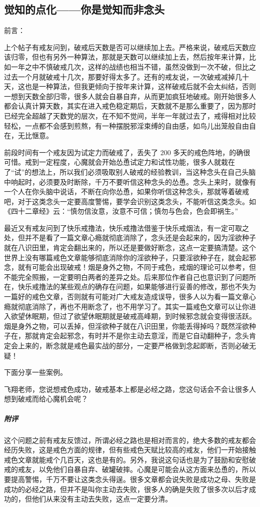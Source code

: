 \subsection{觉知的点化——你是觉知而非念头}

前言：

上个帖子有戒友问到，破戒后天数是否可以继续加上去。严格来说，破戒后天数应该归零，但也有另外一种算法，那就是天数可以继续加上去，然后按年来计算，比如一年之中不慎破戒几次，这样的战绩也相当不错，虽然没做到一次不破，但比之过去一个月就破戒十几次，那要好得太多了。还有的戒友说，一次破戒减掉几十天，这也是一种算法，但我更倾向于按年来计算，这样破戒后就不会太纠结，否则一想到天数全部归零，很多人就会自暴自弃，从而更加疯狂地破戒。刚开始很多人都会认真计算天数，其实在进入戒色稳定期后，天数就不是那么重要了，因为那时已经完全超越了天数党的层次，在不知不觉间，半年一年就过去了，戒得相对比较轻松，一点都不会感到煎熬，有一种摆脱邪淫束缚的自由感，如鸟儿出笼般自由自在，无比惬意。

前段时间有一个戒友因为试定力而破戒了，丢失了 200 多天的戒色阵地，的确很可惜。戒到一定程度，心魔就会开始怂恿试定力和试性功能，很多人就栽在了“试”的想法上，所以我们必须吸取别人破戒的经验教训，当这种念头在自己头脑中响起时，必须要及时断除，千万不要听信这种念头的怂恿。念头上来时，就像有一个人在你头脑中说话，不断在向你怂恿，如果你听信这种念头，那就等着破戒吧，对于这类念头一定要高度警惕，要学会识别这类念头，不能听信这类念头。如《四十二章经》云：“慎勿信汝意，汝意不可信；慎勿与色会，色会即祸生。”

最近又有戒友问到了快乐戒撸法，快乐戒撸法借鉴于快乐戒烟法，有一定可取之处，但并不是看了一篇文章心瘾就彻底消除了，念头还是会起来的，因为淫欲种子就在八识田里，肯定会翻出来的，所以还是要做好断念，这点一定要搞清楚。这个世界上没有哪篇戒色文章能够彻底消除你的淫欲种子，只要淫欲种子在，就会起邪念，就有可能会出现破戒！烟是身外之物，不同于戒色，戒烟的理论可以参考，但不能完全照搬，一定要明白两者的差异之处。后来那位作者自己也意识到了问题所在，快乐戒撸法的某些观点的确存在问题，如果能够进行妥善的修改，那也不失为一篇好的戒色文章，否则就有可能对广大戒友造成误导，很多人以为看一篇文章心瘾就彻底消除了，再也不用断念了，也不用学习了。其实一篇戒色文章可以让你进入欲望休眠期，但过了欲望休眠期就是破戒高峰期，到时候邪念就会变得很活跃。烟是身外之物，可以丢掉，但淫欲种子就在八识田里，你能丢得掉吗？既然淫欲种子在，那就肯定会起邪念，有时并不是你主动去意淫，而是它自动翻种子，念头肯定会上来的，断念就是戒色最实战的部分，一定要严格做到念起即断，否则必破无疑！

下面分享一些案例。

\begin{case}
    飞翔老师，您说想戒色成功，破戒基本上都是必经之路，您这句话会不会让很多人想到破戒而给心魔机会呢？
    \subparagraph{附评} 这个问题之前有戒友反馈过，所谓必经之路也是相对而言的，绝大多数的戒友都会经历失败，这是戒色方面的规律，但有些戒色天赋比较高的戒友，他们一开始接触戒色文章就能戒个几百天，这也是有的。另外，我说这句话也是为了鼓励和安慰破戒的戒友，以免他们自暴自弃、破罐破摔。心魔是可能会从这方面来怂恿的，所以要提高警惕，千万不要让这类念头得逞。很多文章都会说失败是成功之母、失败是成功的必经之路，但并不是叫你主动去失败，很多人的确是失败了很多次以后才成功的，但他们从来没有主动去失败，这点一定要分清。
\end{case}

